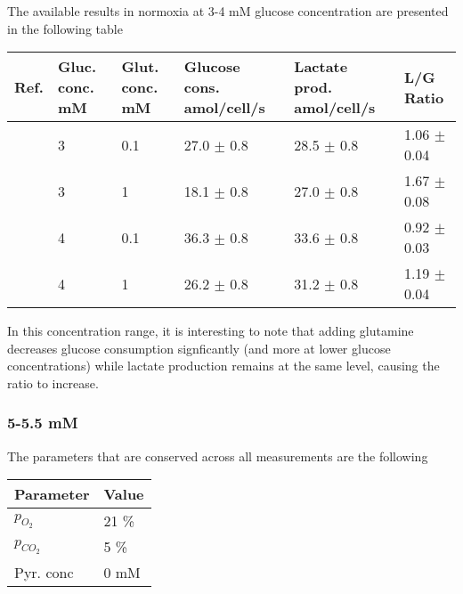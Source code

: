 \documentclass[11pt,a4paper]{article}
\begin{document}
The available results in normoxia at 3-4 mM glucose concentration are presented in the following table 

\begin{table}[h!]
\begin{center}
\begin{tabular}{ |p{7mm}|p{12mm}|p{12mm}|p{21mm}|p{23mm}|p{25mm}| }
 \hline
 \textbf{Ref.} & \textbf{Gluc. conc.}  mM & \textbf{Glut. conc.}  mM & \textbf{Glucose cons.} amol/cell/s & \textbf{Lactate prod.} amol/cell/s& \textbf{L/G Ratio} \\
 \hline
   \cite{Otto2015} & 3 & 0.1 &   27.0  $\pm$ 0.8 &  28.5 $\pm$  0.8   & 1.06 $\pm$  0.04 \\
   \hline
      \cite{Otto2015} & 3 & 1 &   18.1  $\pm$ 0.8 &  27.0 $\pm$  0.8   & 1.67 $\pm$  0.08 \\
   \hline
   \cite{Otto2015} & 4 & 0.1 &   36.3  $\pm$ 0.8 &  33.6 $\pm$  0.8   & 0.92 $\pm$  0.03 \\
   \hline
      \cite{Otto2015} & 4 & 1 &   26.2  $\pm$ 0.8 &  31.2 $\pm$  0.8   & 1.19 $\pm$  0.04 \\
   \hline
\end{tabular}
\end{center}
\end{table}

In this concentration range, it is interesting to note that adding glutamine decreases glucose consumption signficantly (and  more at lower glucose concentrations) while lactate production remains at the same level, causing the ratio to increase.

\subsubsection{5-5.5 mM }
The parameters that are conserved across all measurements are the following\\ 

\begin{table}[h!]
\begin{center}
\begin{tabular}{ |p{25mm}|p{25mm}|}
\hline
\textbf{Parameter} & \textbf{Value} \\
\hline
$p_{O_2}$ & 21 \% \\
\hline
$p_{CO_2}$ & 5 \% \\ %
\hline
Pyr. conc & 0 mM \\ %
\hline
\end{tabular}
\end{center}
\end{table}
\end{document}
